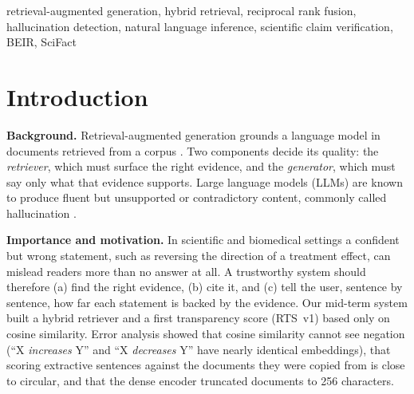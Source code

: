 \documentclass[conference]{IEEEtran}
\begin{document}
\begin{IEEEkeywords}
retrieval-augmented generation, hybrid retrieval, reciprocal rank fusion, hallucination detection, natural language
inference, scientific claim verification, BEIR, SciFact
\end{IEEEkeywords}

\section{Introduction}
\textbf{Background.} Retrieval-augmented generation grounds a language model in documents retrieved from a corpus
\cite{lewis2020rag}. Two components decide its quality: the \emph{retriever}, which must surface the right evidence, and
the \emph{generator}, which must say only what that evidence supports. Large language models (LLMs) are known to produce
fluent but unsupported or contradictory content, commonly called hallucination \cite{ji2023survey}.

\textbf{Importance and motivation.} In scientific and biomedical settings a confident but wrong statement, such as
reversing the direction of a treatment effect, can mislead readers more than no answer at all. A trustworthy system
should therefore (a) find the right evidence, (b) cite it, and (c) tell the user, sentence by sentence, how far each
statement is backed by the evidence. Our mid-term system built a hybrid retriever and a first transparency score
(RTS~v1) based only on cosine similarity. Error analysis showed that cosine similarity cannot see negation (``X
\emph{increases} Y'' and ``X \emph{decreases} Y'' have nearly identical embeddings), that scoring extractive sentences
against the documents they were copied from is close to circular, and that the dense encoder truncated documents to 256
characters.
\end{document}
